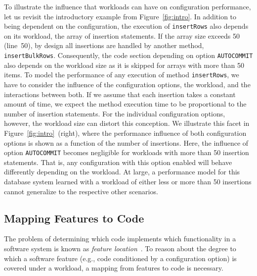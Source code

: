 To illustrate the influence that workloads can have on
configuration performance, let us revisit the introductory example from Figure~\ref{fig:intro}. In addition to being dependent on the configuration, the execution of \texttt{insertRows} also depends on its workload,  the array of insertion statements. If the array size exceeds 50 (line~50), by design all insertions are handled by another method, \texttt{insertBulkRows}. Consequently, the code section depending on option \texttt{AUTOCOMMIT} also depends on the workload size as it is skipped for arrays with more than 50 items. 
To model the performance of any execution of method \texttt{insertRows}, we have to consider the influence of the configuration options, the workload, and the interactions between both. If we assume that each insertion takes a constant amount of time, we expect the method execution time to be proportional to the number of insertion statements. For the individual configuration options, however, the workload size can distort this conception. We illustrate this facet in Figure~\ref{fig:intro}~(right), where the performance influence of both configuration options is shown as a function of the number of insertions. Here, the influence of option \texttt{AUTOCOMMIT} becomes negligible for workloads with more than 50 insertion statements. That is, any configuration  with this option enabled will behave differently depending on the workload. At large, a performance model for this database system learned with a workload of either less or more than 50 insertions cannot generalize to the respective other scenarios.


\subsection{Mapping Features to Code}\label{sec:feature_location}
The problem of determining which code implements which functionality in a software system is known as \emph{feature location}~\cite{rubin_feature_2013}. To reason about the degree to which a software feature (e.g., code conditioned by a configuration option) is covered under a workload, a mapping from features to code is necessary. 

